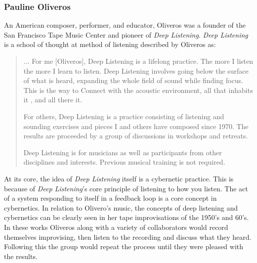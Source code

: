 \subsubsection{Pauline Oliveros} %
An American composer, performer, and educator, Oliveros was a founder of the San Francisco Tape Music Center and pioneer of\textit{ Deep Listening}\cite{HolmesElectronicMusic2020}. \textit{Deep Listening} is a school of thought at method of listening described by Oliveros as:

\begin{quote}
    ... For me [Oliveros], Deep Listening is a lifelong practice. The more I listen the more I learn to listen. Deep Listening involves going below the surface of what is heard, expanding the whole field of sound while finding focus. This is the way to Connect with the acoustic environment, all that inhabits it , and all there it.

    For others, Deep Listening is a practice consisting of listening and sounding exercises and pieces I and others have composed since 1970. The results are proceeded by a group of discussions in workshops and retreats. 

    Deep Listening is for musicians as well as participants from other disciplines and interests. Previous musical training is not required\cite{cultureandHumanity2002}.
\end{quote}

At its core, the idea of \textit{Deep Listening} itself is a cybernetic practice\cite{gordosOliverosCybernetics}. This is because of \textit{Deep Listening}'s core principle of listening to how you listen. The act of a system responding to itself in a feedback loop is a core concept in cybernetics. In relation to Olivero's music, the concepts of deep listening and cybernetics can be clearly seen in her tape improvisations of the 1950's and 60's. In these works Oliveros along with a variety of collaborators would record themselves improvising, then listen to the recording and discuss what they heard. Following this the group would repeat the process until they were pleased with the results\cite{gordosOliverosCybernetics}. 

